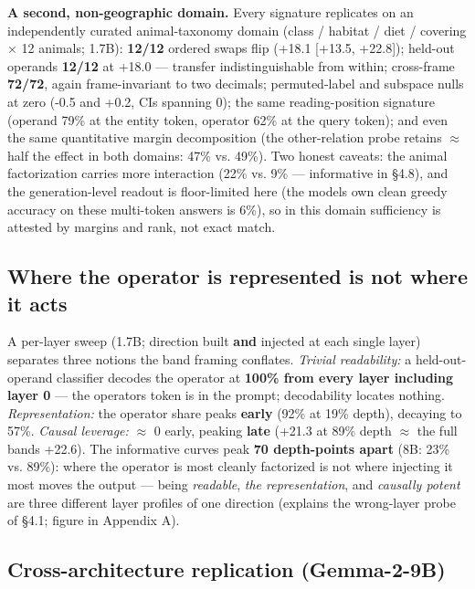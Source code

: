 \textbf{A second, non-geographic domain.} Every signature replicates on
an independently curated animal-taxonomy domain (class / habitat / diet
/ covering \ensuremath{\times} 12 animals; 1.7B): \textbf{12/12} ordered swaps flip (+18.1
{[}+13.5, +22.8{]}); held-out operands \textbf{12/12} at +18.0 ---
transfer indistinguishable from within; cross-frame \textbf{72/72},
again frame-invariant to two decimals; permuted-label and subspace nulls
at zero (-0.5 and +0.2, CIs spanning 0); the same reading-position
signature (operand 79\% at the entity token, operator 62\% at the query
token); and even the same quantitative margin decomposition (the
other-relation probe retains \ensuremath{\approx} half the effect in both domains: 47\% vs.
49\%). Two honest caveats: the animal factorization carries more
interaction (22\% vs. 9\% --- informative in \S{}4.8), and the
generation-level readout is floor-limited here (the
model\textquotesingle s own clean greedy accuracy on these multi-token
answers is 6\%), so in this domain sufficiency is attested by margins
and rank, not exact match.

\subsection{Where the operator is represented is not where it
acts}

A per-layer sweep (1.7B; direction built \textbf{and} injected at each
single layer) separates three notions the band framing conflates.
\emph{Trivial readability:} a held-out-operand classifier decodes the
operator at \textbf{100\% from every layer including layer 0} --- the
operator\textquotesingle s token is in the prompt; decodability locates
nothing. \emph{Representation:} the operator share peaks \textbf{early}
(92\% at 19\% depth), decaying to 57\%. \emph{Causal leverage:} \ensuremath{\approx} 0
early, peaking \textbf{late} (+21.3 at 89\% depth \ensuremath{\approx} the full
band\textquotesingle s +22.6). The informative curves peak \textbf{70
depth-points apart} (8B: 23\% vs. 89\%): where the operator is most
cleanly factorized is not where injecting it most moves the output ---
being \emph{readable}, \emph{the representation}, and \emph{causally
potent} are three different layer profiles of one direction (explains
the wrong-layer probe of \S{}4.1; figure in Appendix A).

\subsection{Cross-architecture replication
(Gemma-2-9B)}

